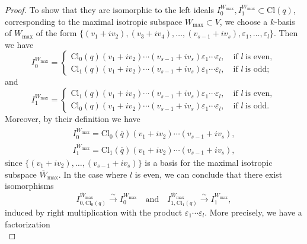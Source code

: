 \documentclass[a4paper, twoside, 11pt]{amsart}
\theoremstyle{definition}
\theoremstyle{remark}
\numberwithin{equation}{theorem}
\newcommand{\wmax}{W_{\text{max}}}
\newcommand{\evencl}{\mathrm{Cl}_0}
\newcommand{\oddcl}{\mathrm{Cl}_1}
\newcommand{\cl}{\mathrm{Cl}}
\begin{document}
\begin{proof}
    To show that they are isomorphic to the left ideals $I_0^{\wmax}, I_1^{\wmax} \subset \cl(q)$, corresponding to the maximal isotropic subspace $\wmax \subset V$, we choose a $k$-basis of $\wmax$ of the form $\{(v_1+iv_2), (v_3+iv_4), \dots, (v_{s-1}+iv_s), \varepsilon_1,\dots,\varepsilon_l\}$. Then we have
    \begin{equation*}
        I_0^{\wmax} = \begin{cases}
            \evencl(q) (v_1+iv_2)\cdots(v_{s-1}+iv_s)\varepsilon_1\cdots\varepsilon_l, \quad \text{if } l \ \text{is even}, \\
            \oddcl(q) (v_1+iv_2)\cdots(v_{s-1}+iv_s)\varepsilon_1\cdots\varepsilon_l, \quad \text{if } l \ \text{is odd};
        \end{cases}
    \end{equation*}
    and 
    \begin{equation*}
        I_1^{\wmax} = \begin{cases}
            \oddcl(q) (v_1+iv_2)\cdots(v_{s-1}+iv_s)\varepsilon_1\cdots\varepsilon_l, \quad \text{if } l \ \text{is even}, \\
            \evencl(q) (v_1+iv_2)\cdots(v_{s-1}+iv_s)\varepsilon_1\cdots\varepsilon_l, \quad \text{if } l \ \text{is odd}.
        \end{cases}
    \end{equation*}
    Moreover, by their definition we have
    \begin{equation*}
    \begin{aligned}
        I_{0}^{\overline{W}_{\text{max}}} = \evencl(\bar{q})(v_1+iv_2)\cdots(v_{s-1}+iv_s), \\
        I_{1}^{\overline{W}_{\text{max}}} = \oddcl(\bar{q})(v_1+iv_2)\cdots(v_{s-1}+iv_s),
    \end{aligned}
    \end{equation*}
    since $\{(v_1+iv_2),\dots, (v_{s-1}+iv_s)\}$ is a basis for the maximal isotropic subspace $\overline{W}_{\text{max}}$.
    In the case where $l$ is even, we can conclude that there exist isomorphisms 
    \begin{equation}\label{isos_key}
    I_{0,\evencl(q)}^{\overline{W}_{\text{max}}}\overset{\sim}{\longrightarrow} I_0^{\wmax} \quad \text{and} \quad I_{1,\oddcl(q)}^{\overline{W}_{\text{max}}} \overset{\sim}{\longrightarrow} I_1^{\wmax},
    \end{equation}
    induced by right multiplication with the product $\varepsilon_1\cdots\varepsilon_l$. More precisely, we have a factorization
    \begin{equation*}

\end{equation*}
\end{proof}
\end{document}
